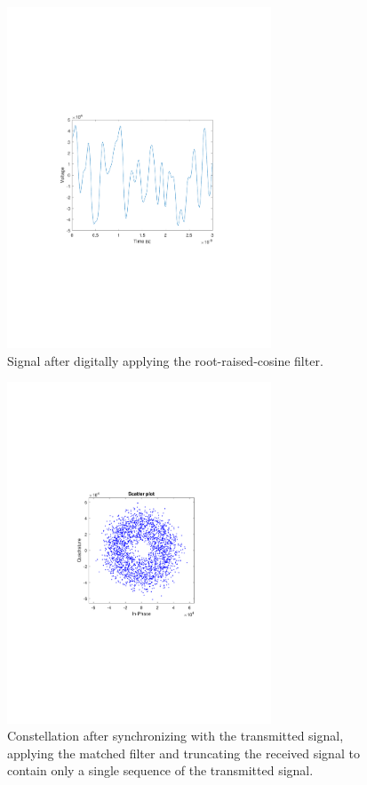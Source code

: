 \begin{figure}[H]
\centering
\includegraphics[clip, trim=4cm 8cm 4cm 8cm, width=0.7\textwidth]{./sdf/m_qam_system/figures/exp/MF_03.pdf}
\caption{Signal after digitally applying the root-raised-cosine filter.}
\label{fig:qamMfSig}
\end{figure}

\begin{figure}[H]
	\centering
	\includegraphics[clip, trim=4cm 8cm 4cm 8cm, width=0.7\textwidth]{./sdf/m_qam_system/figures/exp/const-synMF-sps.pdf}
	\caption{Constellation after synchronizing with the transmitted signal, applying the matched filter and truncating the received signal to contain only a single sequence of the transmitted signal.}
	\label{fig:rxMfSync}
\end{figure}

